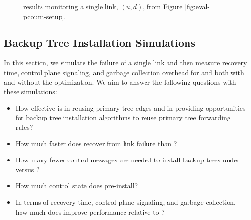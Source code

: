 \begin{figure}[t]
\begin{center}
  \end{center}
	\caption{\pcnt results monitoring a single link, $(u,d)$, from Figure \ref{fig:eval-pcount-setup}.}
  \label{fig:pcount-res}
\end{figure}



\subsection{Backup Tree Installation Simulations}
\label{subsec:eval-backuptrees}

In this section, we simulate the failure of a single link and then measure recovery time, control plane signaling, and garbage collection overhead for \pre and \post both with and without
the \merge optimization. We aim to answer the following questions with these simulations: 
\begin{itemize}
	\item How effective is \steiner in reusing primary tree edges and in providing opportunities for backup tree installation algorithms to reuse primary tree forwarding rules?
	\item How much faster does \pre recover from link failure than \posts? 
	\item How many fewer control messages are needed to install backup trees under \pre versus \posts?
	\item How much control state does \pre pre-install?
	\item In terms of recovery time, control plane signaling, and garbage collection, how much does \merge improve performance relative to \bases?
\end{itemize}



